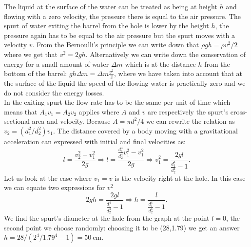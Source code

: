 {\ifEngSolution
The liquid at the surface of the water can be treated as being at height $h$ and flowing with a zero velocity, the pressure there is equal to the air pressure. The spurt of water exiting the barrel from the hole is lower by the height $h$, the pressure again has to be equal to the air pressure but the spurt moves with a velocity $v$. From the Bernoulli’s principle we can write down that $\rho g h = \rho v^2/2$ where we get that $v^2=2gh$. Alternatively we can write down the conservation of energy for a small amount of water $\Delta m$ which is at the distance $h$ from the bottom of the barrel: $ g h \Delta m = \Delta m \frac{v^2}{2}$, where we have taken into account that at the surface of the liquid the speed of the flowing water is practically zero and we do not consider the energy losses.\\
In the exiting spurt the flow rate has to be the same per unit of time which means that $A_1v_1=A_2v_2$ applies where $A$ and $v$ are respectively the spurt’s cross-sectional area and velocity. Because $A=\pi d^2/4$ we can rewrite the relation as $v_2=(d_1^2/d_2^2)v_1$. The distance covered by a body moving with a gravitational acceleration can expressed with initial and final velocities as:
$$l=\frac{v_2^2-v_1^2}{2g} \Rightarrow l=\frac{\frac{d_1^4}{d_2^4}v_1^2-v_1^2}{2g} \Rightarrow v_1^2=\frac{2gl}{\frac{d_1^4}{d_2^4}-1}.$$
Let us look at the case where $v_1=v$ is the velocity right at the hole. In this case we can equate two expressions for $v^2$ 
$$2gh=\frac{2gl}{\frac{d_1^4}{d_2^4}-1}\Rightarrow h=\frac{l}{\frac{d_1^4}{d_2^4}-1}.$$
We find the spurt’s diameter at the hole from the graph at the point $l=0$, the second point we choose randomly: choosing it to be (28,\num{1.79}) we get an answer $h=28/(2^4/\num{1.79}^4-1)=\SI{50}{\cm}$.
\fi
}